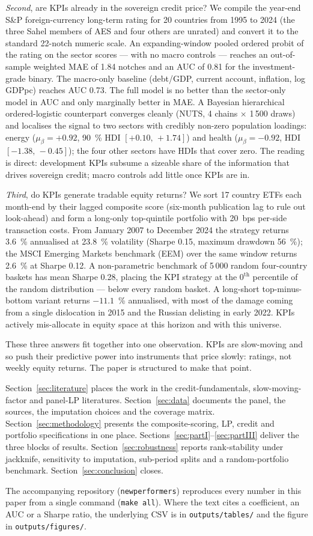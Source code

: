 \emph{Second}, are KPIs already in the sovereign credit price? We compile the year-end S\&P foreign-currency long-term rating for 20 countries from 1995 to 2024 (the three Sahel members of AES and four others are unrated) and convert it to the standard 22-notch numeric scale. An expanding-window pooled ordered probit of the rating on the sector scores --- with no macro controls --- reaches an out-of-sample weighted MAE of 1.84 notches and an AUC of 0.81 for the investment-grade binary. The macro-only baseline (debt/GDP, current account, inflation, log GDPpc) reaches AUC 0.73. The full model is no better than the sector-only model in AUC and only marginally better in MAE. A Bayesian hierarchical ordered-logistic counterpart converges cleanly (NUTS, 4 chains $\times$ 1\,500 draws) and localises the signal to two sectors with credibly non-zero population loadings: energy ($\mu_\beta = +0.92$, 90~\% HDI $[+0.10,\,+1.74]$) and health ($\mu_\beta = -0.92$, HDI $[-1.38,\,-0.45]$); the four other sectors have HDIs that cover zero. The reading is direct: development KPIs subsume a sizeable share of the information that drives sovereign credit; macro controls add little once KPIs are in.

\emph{Third}, do KPIs generate tradable equity returns? We sort 17 country ETFs each month-end by their lagged composite score (six-month publication lag to rule out look-ahead) and form a long-only top-quintile portfolio with 20~bps per-side transaction costs. From January 2007 to December 2024 the strategy returns 3.6~\% annualised at 23.8~\% volatility (Sharpe 0.15, maximum drawdown 56~\%); the MSCI Emerging Markets benchmark (EEM) over the same window returns 2.6~\% at Sharpe 0.12. A non-parametric benchmark of 5\,000 random four-country baskets has mean Sharpe 0.28, placing the KPI strategy at the $0^{\text{th}}$ percentile of the random distribution --- below every random basket. A long-short top-minus-bottom variant returns $-11.1$~\% annualised, with most of the damage coming from a single dislocation in 2015 and the Russian delisting in early 2022. KPIs actively mis-allocate in equity space at this horizon and with this universe.

These three answers fit together into one observation. KPIs are slow-moving and so push their predictive power into instruments that price slowly: ratings, not weekly equity returns. The paper is structured to make that point.

Section~\ref{sec:literature} places the work in the credit-fundamentals, slow-moving-factor and panel-LP literatures. Section~\ref{sec:data} documents the panel, the sources, the imputation choices and the coverage matrix. Section~\ref{sec:methodology} presents the composite-scoring, LP, credit and portfolio specifications in one place. Sections~\ref{sec:partI}--\ref{sec:partIII} deliver the three blocks of results. Section~\ref{sec:robustness} reports rank-stability under jackknife, sensitivity to imputation, sub-period splits and a random-portfolio benchmark. Section~\ref{sec:conclusion} closes.

The accompanying repository (\texttt{newperformers}) reproduces every number in this paper from a single command (\verb|make all|). Where the text cites a coefficient, an AUC or a Sharpe ratio, the underlying CSV is in \verb|outputs/tables/| and the figure in \verb|outputs/figures/|.
